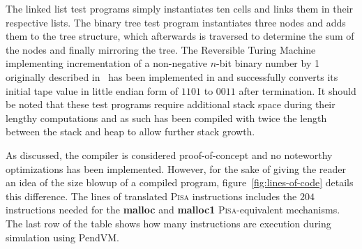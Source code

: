 The linked list test programs simply instantiates ten cells and links them in their respective lists. The binary tree test program instantiates three nodes and adds them to the tree structure, which afterwards is traversed to determine the sum of the nodes and finally mirroring the tree. The Reversible Turing Machine implementing incrementation of a non-negative $n$-bit binary number by 1 originally described in~\cite{ty:ejanus} has been implemented in \rooplpp and successfully converts its initial tape value in little endian form of $1101$ to $0011$ after termination. It should be noted that these test programs require additional stack space during their lengthy computations and as such has been compiled with twice the length between the stack and heap to allow further stack growth.

As discussed, the compiler is considered proof-of-concept and no noteworthy optimizations has been implemented. However, for the sake of giving the reader an idea of the size blowup of a compiled \rooplpp program, figure~\ref{fig:lines-of-code} details this difference. The lines of translated \textsc{Pisa} instructions includes the $204$ instructions needed for the \textbf{malloc} and \textbf{malloc1} \textsc{Pisa}-equivalent mechanisms. The last row of the table shows how many instructions are execution during simulation using PendVM.


